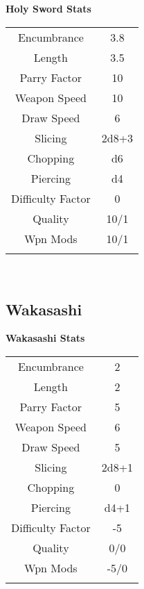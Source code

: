 \documentclass[10pt]{report}
\begin{document}
\begin{table}{\bf Holy Sword Stats}\\[1ex]
  \begin{tabular}{|c|c|}\hline
          &      \\ \hline
Encumbrance     & 3.8   \\
Length  & 3.5 \\
Parry Factor    & 10    \\
Weapon Speed    & 10    \\
Draw Speed      & 6     \\
Slicing         & 2d8+3 \\
Chopping        & d6 \\
Piercing                & d4 \\
Difficulty Factor       & 0 \\
Quality         & 10/1 \\
Wpn Mods        & 10/1 \\
          &      \\ \hline
  \end{tabular} \\[0.5ex]
{}
\end{table}

\subsection{Wakasashi}

\begin{table}{\bf Wakasashi Stats}\\[1ex]
  \begin{tabular}{|c|c|}\hline
          &      \\ \hline
Encumbrance     & 2     \\
Length  & 2 \\
Parry Factor    & 5     \\
Weapon Speed    & 6     \\
Draw Speed      & 5     \\
Slicing         & 2d8+1 \\
Chopping        & 0 \\
Piercing                & d4+1 \\
Difficulty Factor       & -5 \\
Quality         & 0/0 \\
Wpn Mods        & -5/0  \\
          &      \\ \hline
  \end{tabular} \\[0.5ex]
{}
\end{table}
\end{document}
